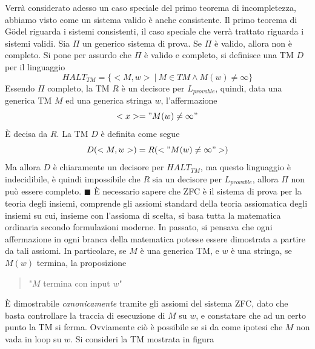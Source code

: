 \documentclass[10pt, letterpaper]{report}
\begin{document}
Verrà considerato adesso un caso speciale del primo teorema di incompletezza, abbiamo visto come un sistema valido è anche consistente. Il primo teorema di Gödel riguarda i sistemi consistenti, il caso speciale che verrà trattato riguarda i sistemi validi. \acc 
{} Sia $\Pi$ un generico sistema di prova. Se $\Pi$ è valido, allora non è completo.\acc 
\dimo{} Si pone per assurdo che $\Pi$ è valido e completo, si definisce una TM $D$ per il linguaggio 
$$ HALT_{TM}=\{<M,w> \ | \ M\in TM\land M(w)\ne \infty \}$$
Essendo $\Pi$ completo, la TM $R$ è un decisore per $ L_{provable}$, quindi, data una generica TM $M$ ed una generica stringa $w$, l'affermazione  
$$ <x>="M(w)\ne \infty"$$
È decisa da $R$. La TM $D$ è definita come segue 
$$ D(<M,w>)=R(<"M(w)\ne \infty">)$$
Ma allora $D$ è chiaramente un decisore per $HALT_{TM}$, ma questo linguaggio è indecidibile, è quindi impossibile che $R$ sia un decisore per $ L_{provable}$, allora $\Pi$ non può essere completo.
\hfill$\blacksquare$\acc 
È necessario sapere che ZFC è il sistema di prova per la teoria degli insiemi, comprende gli assiomi standard della teoria assiomatica degli insiemi su cui, insieme con l'assioma di scelta, si basa tutta la matematica ordinaria secondo formulazioni moderne. In passato, si pensava che ogni affermazione in ogni branca della matematica potesse essere dimostrata a partire da tali assiomi.\acc 
In particolare, se $M$ è una generica TM, e $w$ è una stringa, se $M(w)$ termina, la proposizione \begin{quote}
    "$M$ termina con input $w$"
\end{quote}
È dimostrabile \textit{canonicamente} tramite gli assiomi del sistema ZFC, dato che basta controllare la traccia di esecuzione di $M$ su $w$, e constatare che ad un certo punto la TM si ferma. Ovviamente ciò è possibile se si da come ipotesi che $M$ non vada in loop su $w$.
\acc 
Si consideri la TM mostrata in figura \begin{center}
\end{center}
\end{document}
